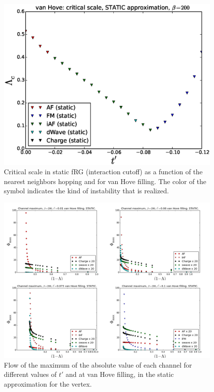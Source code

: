 \begin{figure}
\includegraphics[scale=0.5]{images/vanHove_scan_critical_lambda_phiSTATIC.eps}
\caption{Critical scale in static fRG (interaction cutoff) as a function of the nearest neighbors hopping and for van Hove filling. The color of the symbol indicates the kind of instability that is realized.} 
\label{phasediag_van_hoveSTATIC} 
\end{figure}


\begin{figure}
\includegraphics[scale=0.25]{images/static.png}
\caption{Flow of the maximum of the absolute value of each channel for different values of $t'$ and at van Hove filling, in the static approximation for the vertex.
} 
\label{lamstatic} 
\end{figure}


